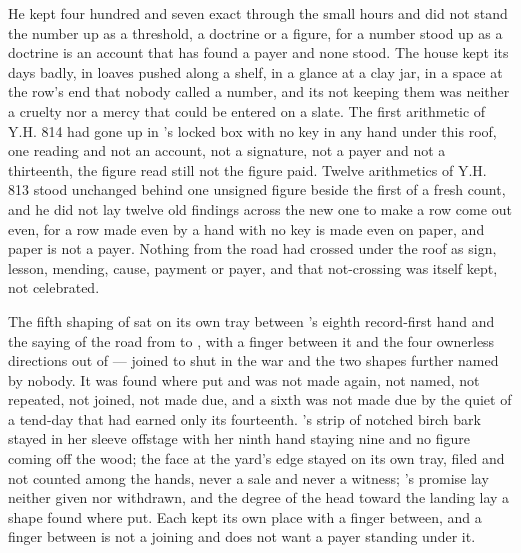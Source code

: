 He kept four hundred and seven exact through the small hours and did not stand the number up as a threshold, a doctrine or a figure, for a number stood up as a doctrine is an account that has found a payer and none stood. The house kept its days badly, in loaves pushed along a shelf, in a glance at a clay jar, in a space at the row's end that nobody called a number, and its not keeping them was neither a cruelty nor a mercy that could be entered on a slate. The first arithmetic of Y.H. 814 had gone up  in 's locked box with no key in any hand under this roof, one reading and not an account, not a signature, not a payer and not a thirteenth, the figure read still not the figure paid. Twelve arithmetics of Y.H. 813 stood unchanged behind one unsigned figure beside the first of a fresh count, and he did not lay twelve old findings across the new one to make a row come out even, for a row made even by a hand with no key is made even on paper, and paper is not a payer. Nothing from the road had crossed under the roof as sign, lesson, mending, cause, payment or payer, and that not-crossing was itself kept, not celebrated.

The fifth shaping of  sat on its own tray between 's eighth record-first hand and the saying of the road from  to , with a finger between it and the four ownerless directions out of  ---  joined to  shut in the war and the two shapes further named by nobody. It was found where put and was not made again, not named, not repeated, not joined, not made due, and a sixth was not made due by the quiet of a tend-day that had earned only its fourteenth. 's strip of notched birch bark stayed in her sleeve offstage with her ninth hand staying nine and no figure coming off the wood; the face at the yard's edge stayed on its own tray, filed and not counted among the hands, never a sale and never a witness; 's promise lay neither given nor withdrawn, and the degree of the head toward the landing lay a shape found where put. Each kept its own place with a finger between, and a finger between is not a joining and does not want a payer standing under it.

